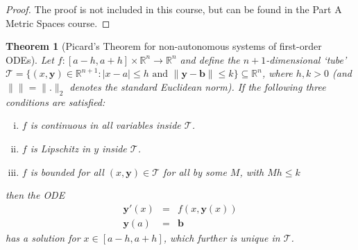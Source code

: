 \documentclass[10pt,fleqn]{article}
\newcommand{\reals}{\mathbb{R}}
\newcommand{\vc}[1]{\boldsymbol{#1}}
\theoremstyle{definition} \newtheorem{defn}{Definition}[section]
\theoremstyle{plain}      \newtheorem{thm}[defn]{Theorem}
\theoremstyle{plain}      \newtheorem{lem}[defn]{Lemma}
\theoremstyle{definition} \newtheorem{prop}[defn]{Proposition}
\theoremstyle{definition} \newtheorem{cor}[defn]{Corollary}
\theoremstyle{definition} \newtheorem{ex}[defn]{Example}
\theoremstyle{definition} \newtheorem{rem}[defn]{Remark}
\begin{document}
\begin{proof}
    The proof is not included in this course, but can be found in the Part A Metric Spaces course.
\end{proof}

\begin{thm}[Picard's Theorem for non-autonomous systems of first-order ODEs]
    Let $f:[a-h,a+h]\times\reals^n\to\reals^n$ and define the $n+1$-dimensional `tube' $\mathcal{T}=\{(x,\vc{y})\in\reals^{n+1}\colon|x-a|\leq h\text{ and }\|\vc{y}-\vc{b}\|\leq k\}\subseteq\reals^n$, where $h,k>0$ (and $\|\|=\|.\|_2$ denotes the standard Euclidean norm).
    If the following three conditions are satisfied:
    \begin{enumerate}[(i)]
        \item $f$ is continuous in all variables inside $\mathcal{T}$.
        \item $f$ is Lipschitz in $y$ inside $\mathcal{T}$.
        \item $f$ is bounded for all $(x,\vc{y})\in\mathcal{T}$ for all by some $M$, with $Mh\leq k$
    \end{enumerate}
    then the ODE
    \[
        \begin{array}{rcl}
            \vc{y}'(x) &=& f(x,\vc{y}(x))\\
            \vc{y}(a) &=& \vc{b}
        \end{array}
    \]
    has a solution for $x\in[a-h,a+h]$, which further is unique in $\mathcal{T}$.
\end{thm}
\end{document}
